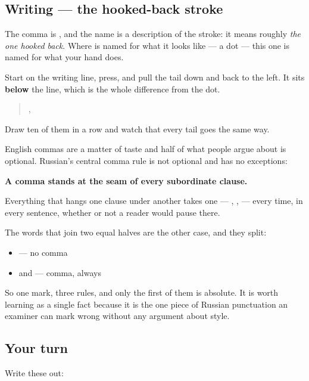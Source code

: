 \subsection*{Writing — the hooked-back stroke}
The comma is \textbf{}, and the name is a description of the stroke: it means roughly \emph{the one hooked back}. Where \textbf{} is named for what it looks like — a dot — this one is named for what your hand does.

Start on the writing line, press, and pull the tail down and back to the left. It sits \textbf{below} the line, which is the whole difference from the dot.

\begin{quote}
,
\end{quote}

Draw ten of them in a row and watch that every tail goes the same way.

\begin{grammarlens}[title={Grammar lens — the rule that has no exceptions}]
English commas are a matter of taste and half of what people argue about is optional. Russian's central comma rule is not optional and has no exceptions:

\textbf{A comma stands at the seam of every subordinate clause.}

Everything that hangs one clause under another takes one — \textbf{}, \textbf{ }, \textbf{} — every time, in every sentence, whether or not a reader would pause there.

The words that join two equal halves are the other case, and they split:

\begin{itemize}
\raggedright
  \item \textbf{} — no comma
  \item \textbf{} and \textbf{} — comma, always
\end{itemize}

So one mark, three rules, and only the first of them is absolute. It is worth learning as a single fact because it is the one piece of Russian punctuation an examiner can mark wrong without any argument about style.
\end{grammarlens}

\subsection*{Your turn}
Write these out:

